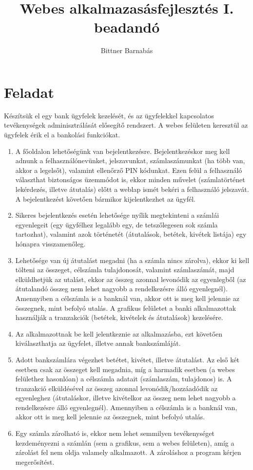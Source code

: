 \documentclass{article}
\begin{document}
\title{Webes alkalmazasásfejlesztés I. beadandó}
\author{Bittner Barnabás}
\maketitle
\pagebreak
\tableofcontents
\pagebreak
\section{Feladat}
\par Készítsük el egy bank ügyfelek kezelését, és az ügyfelekkel kapcsolatos tevékenységek adminisztrálását elősegítő rendszert. A webes felületen keresztül az ügyfelek érik el a bankolási funkciókat. 
 \begin{enumerate}
 	\item A főoldalon lehetőségünk van bejelentkezésre. Bejelentkezéskor meg kell adnunk a felhasználónevünket, jelszavunkat, számlaszámunkat (ha több van, akkor a legelsőt), valamint ellenőrző PIN kódunkat. Ezen felül a felhasználó választhat biztonságos üzemmódot is, ekkor minden művelet (számlatörténet lekérdezés, illetve átutalás) előtt a weblap ismét bekéri a felhasználó jelszavát. A bejelentkezést követően bármikor kijelentkezhet az ügyfél.
 	\item Sikeres bejelentkezés esetén lehetősége nyílik megtekinteni a számlái egyenlegeit (egy ügyfélhez legalább egy, de tetszőlegesen sok számla tartozhat), valamint azok történetét (átutalások, betétek, kivétek listája) egy hónapra visszamenőleg.
 	\item Lehetősége van új átutalást megadni (ha a számla nincs zárolva), ekkor ki kell tölteni az összeget, célszámla tulajdonosát, valamint számlaszámát, majd elküldhetjük az utalást, ekkor az összeg azonnal levonódik az egyenlegből (az átutalandó összeg nem lehet nagyobb a rendelkezésre álló egyenlegnél). Amennyiben a célszámla is a banknál van, akkor ott is meg kell jelennie az összegnek, mint befolyó utalás. A grafikus felületet a banki alkalmazottak használják a tranzakciók (betétek, kivételek és átutalások) kezelésére.
 	\item Az alkalmazottnak be kell jelentkeznie az alkalmazásba, ezt követően kiválaszthatja az ügyfelet, illetve annak bankszámláját.
 	\item Adott bankszámlára végezhet betétet, kivétet, illetve átutalást. Az első két esetben csak az összeget kell megadnia, míg a harmadik esetben (a webes felülethez hasonlóan) a célszámla adatait (számlaszám, tulajdonos) is. A tranzakció elküldésével az összeg azonnal levonódik/hozzáadódik az egyenleghez (átutaláskor, illetve kivételkor az összeg nem lehet nagyobb a rendelkezésre álló egyenlegnél). Amennyiben a célszámla is a banknál van, akkor ott is meg kell jelennie az összegnek, mint befolyó utalás.
 	\item Egy számla zárolható is, ekkor nem lehet semmilyen tevékenységet kezdeményezni a számlán (sem a grafikus, sem a webes felületen), amíg a zárolást fel nem oldja valamely alkalmazott. A zároláshoz a program kérjen megerősítést.
\end{enumerate}
\end{document}
